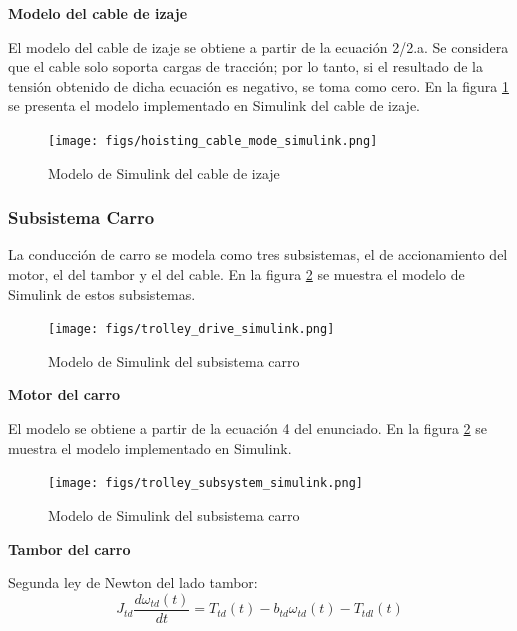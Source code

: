 \documentclass{article}
\begin{document}
            \textbf{Modelo del cable de izaje}

            El modelo del cable de izaje se obtiene a partir de la ecuación 2/2.a. Se considera que el cable solo soporta cargas de tracción; por lo tanto, si el resultado de la tensión obtenido de dicha ecuación es negativo, se toma como cero. En la figura \ref{fig:hoisting_cable_mode_simulink} se presenta el modelo implementado en Simulink del cable de izaje.

            \begin{figure} [H]
                \centering
                \texttt{[image: figs/hoisting\_cable\_mode\_simulink.png]}
                \caption{Modelo de Simulink del cable de izaje}
                \label{fig:hoisting_cable_mode_simulink}
            \end{figure}


        \subsubsection{Subsistema Carro}

            La conducción de carro se modela como tres subsistemas, el de accionamiento del motor, el del tambor y el del cable. En la figura \ref{fig:trolley_drive_simulink} se muestra el modelo de Simulink de estos subsistemas. 

            \begin{figure} [H]
                \centering
                \texttt{[image: figs/trolley\_drive\_simulink.png]}
                \caption{Modelo de Simulink del subsistema carro}
                \label{fig:trolley_drive_simulink}
            \end{figure}

            \textbf{Motor del carro}

            El modelo se obtiene a partir de la ecuación 4 del enunciado. En la figura \ref{fig:trolley_drive_simulink} se muestra el modelo implementado en Simulink.

            \begin{figure} [H]
                \centering
                \texttt{[image: figs/trolley\_subsystem\_simulink.png]}
                \caption{Modelo de Simulink del subsistema carro}
                \label{fig:trolley_subsystem_simulink}
            \end{figure}

            \textbf{Tambor del carro}

            Segunda ley de Newton del lado tambor:
            \begin{equation} \label{eq:tamborCarro}
                J_{td} \frac{d \omega_{td}(t)}{dt} = T_{td}(t) - b_{td} \omega_{td}(t) - T_{tdl}(t)
            \end{equation}
\end{document}
